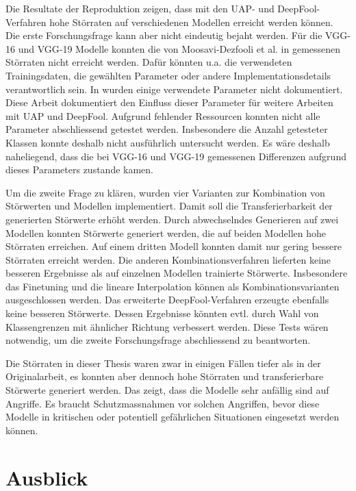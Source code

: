 \documentclass{FFHS_Thesis_Additions/ffhsthesis}
\begin{document}
Die Resultate der Reproduktion zeigen, dass mit den UAP- und DeepFool-Verfahren hohe Störraten auf verschiedenen Modellen erreicht werden können. Die erste Forschungsfrage kann aber nicht eindeutig bejaht werden. Für die VGG-16 und VGG-19 Modelle konnten die von Moosavi-Dezfooli et al. in \cite{moosavi-dezfooli_universal_2017-1} gemessenen Störraten nicht erreicht werden. Dafür könnten u.a. die verwendeten Trainingsdaten, die gewählten Parameter oder andere Implementationsdetails verantwortlich sein. In \cite{moosavi-dezfooli_universal_2017-1} wurden einige verwendete Parameter nicht dokumentiert. Diese Arbeit dokumentiert den Einfluss dieser Parameter für weitere Arbeiten mit UAP und DeepFool. Aufgrund fehlender Ressourcen konnten nicht alle Parameter abschliessend getestet werden. Insbesondere die Anzahl getesteter Klassen konnte deshalb nicht ausführlich untersucht werden. Es wäre deshalb naheliegend, dass die bei VGG-16 und VGG-19 gemessenen Differenzen aufgrund dieses Parameters zustande kamen.

Um die zweite Frage zu klären, wurden vier Varianten zur Kombination von Störwerten und Modellen implementiert. Damit soll die Transferierbarkeit der generierten Störwerte erhöht werden. Durch abwechselndes Generieren auf zwei Modellen konnten Störwerte generiert werden, die auf beiden Modellen hohe Störraten erreichen. Auf einem dritten Modell konnten damit nur gering bessere Störraten erreicht werden. Die anderen Kombinationsverfahren lieferten keine besseren Ergebnisse als auf einzelnen Modellen trainierte Störwerte. Insbesondere das Finetuning und die lineare Interpolation können als Kombinationsvarianten ausgeschlossen werden. Das erweiterte DeepFool-Verfahren erzeugte ebenfalls keine besseren Störwerte. Dessen Ergebnisse könnten evtl. durch Wahl von Klassengrenzen mit ähnlicher Richtung verbessert werden. Diese Tests wären notwendig, um die zweite Forschungsfrage abschliessend zu beantworten.

Die Störraten in dieser Thesis waren zwar in einigen Fällen tiefer als in der Originalarbeit, es konnten aber dennoch hohe Störraten und transferierbare Störwerte generiert werden. Das zeigt, dass die Modelle sehr anfällig sind auf Angriffe. Es braucht Schutzmassnahmen vor solchen Angriffen, bevor diese Modelle in kritischen oder potentiell gefährlichen Situationen eingesetzt werden können.


\section{Ausblick}
\end{document}
